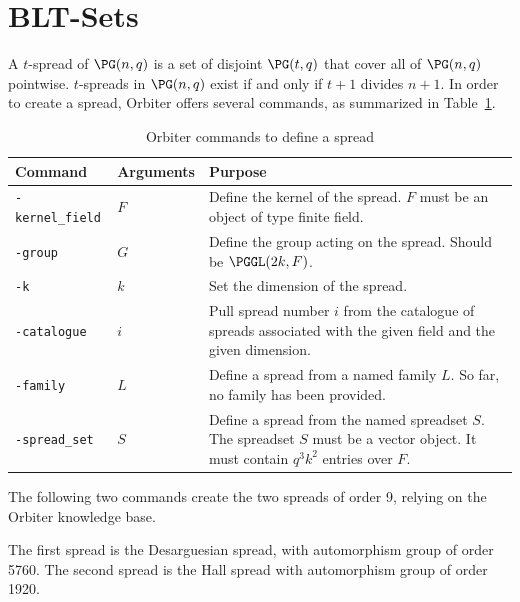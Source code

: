 

	

\clearpage

\section{BLT-Sets}
\label{sec:BLT:sets}



\clearpage



A $t$-spread of $\PG(n,q)$ is a set of disjoint $\PG(t,q)$ that cover all of $\PG(n,q)$ pointwise. 
$t$-spreads in $\PG(n,q)$ exist if and only if $t+1$ divides $n+1.$
In order to create a spread, Orbiter offers several commands, as summarized in Table~\ref{tab:spreads:define}.
\begin{table}
	\begin{center}
	\begin{tabular}{|p{4cm}|p{3cm}|p{7cm}|}
		\hline
		Command & Arguments & Purpose \\
		\hline
		\hline
		\verb'-kernel_field' & $F$ & Define the kernel of the spread. $F$ must be an object of type finite field.\\
		\hline
		\verb'-group' & $G$ & Define the group acting on the spread. Should be $\PGGL(2k,F)$. \\
		\hline
		\verb'-k' & $k$ & Set the dimension of the spread. \\
		\hline
		\verb'-catalogue' & $i$ & Pull spread number $i$ from the catalogue of spreads associated with the given field and the given dimension. \\
		\hline
		\verb'-family' & $L$ & Define a spread from a named family $L.$ So far, no family has been provided. \\
		\hline
		\verb'-spread_set' & $S$ & 
		Define a spread from the named spreadset $S$. 
		The spreadset $S$ must be a vector object. It must contain $q^3k^2$ entries over $F.$ \\
		\hline
		\end{tabular}
	\end{center}
	\caption{\label{tab:spreads:define}Orbiter commands to define a spread}
	\end{table}
The following two commands create the two spreads of order 9, relying on the Orbiter knowledge base.
{\tt

}
{\tt

}
The first spread is the Desarguesian spread, with automorphism group of order 5760.
The second spread is the Hall spread with automorphism group of order 1920.

